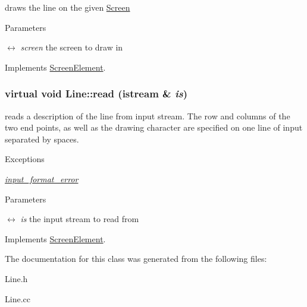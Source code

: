 draws the line on the given \hyperlink{classScreen}{Screen} 
\begin{DoxyParams}{Parameters}
\item[\mbox{$\leftrightarrow$} {\em screen}]the screen to draw in \end{DoxyParams}


Implements \hyperlink{classScreenElement_a1bf719edc836cc6ceaa84014c7342028}{ScreenElement}.\hypertarget{classLine_a8ca52eabbd2ede5f52cf6c220a4c2f2c}{
\subsubsection[{read}]{\setlength{\rightskip}{0pt plus 5cm}virtual void Line::read (istream \& {\em is})}}
\label{classLine_a8ca52eabbd2ede5f52cf6c220a4c2f2c}
reads a description of the line from input stream. The row and columns of the two end points, as well as the drawing character are specified on one line of input separated by spaces. 
\begin{DoxyExceptions}{Exceptions}
\item[{\em \hyperlink{classinput__format__error}{input\_\-format\_\-error}}]\end{DoxyExceptions}

\begin{DoxyParams}{Parameters}
\item[\mbox{$\leftrightarrow$} {\em is}]the input stream to read from \end{DoxyParams}


Implements \hyperlink{classScreenElement_ae5c8356d0faace202bb3ee620433677e}{ScreenElement}.

The documentation for this class was generated from the following files:\begin{DoxyCompactItemize}
\item 
Line.h\item 
Line.cc\end{DoxyCompactItemize}
